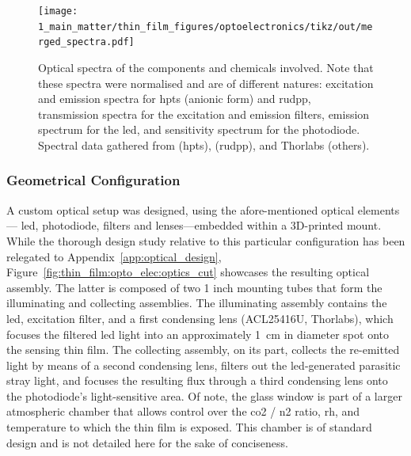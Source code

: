 \begin{figure}
	\texttt{[image: 1\_main\_matter/thin\_film\_figures/optoelectronics/tikz/out/merged\_spectra.pdf]}
	\caption[Optical spectra of the components and chemicals involved.]{Optical spectra of the components and chemicals involved. Note that these spectra were normalised and are of different natures: excitation and emission spectra for \gls{hpts} (anionic form) and \gls{rudpp}, transmission spectra for the excitation and emission filters, emission spectrum for the \gls{led}, and sensitivity spectrum for the photodiode. Spectral data gathered from \cite{wolfbeis1983} (\gls{hpts}), \cite{bultzingslowen2002} (\gls{rudpp}), and Thorlabs (others).}
	\label{fig:thin_film:opto_elec:merged_spectra}
\end{figure}

\subsubsection{Geometrical Configuration}\label{subsect:thin_film:opto_elec:geom_cons}

A custom optical setup was designed, using the afore-mentioned optical elements---\ie{} \gls{led}, photodiode, filters and lenses---embedded within a 3D-printed mount. While the thorough design study relative to this particular configuration has been relegated to Appendix~\ref{app:optical_design}, Figure~\ref{fig:thin_film:opto_elec:optics_cut} showcases the resulting optical assembly. The latter is composed of two 1 inch mounting tubes that form the illuminating and collecting assemblies. The illuminating assembly contains the \gls{led}, excitation filter, and a first condensing lens (ACL25416U, Thorlabs), which focuses the filtered \gls{led} light into an approximately 1~cm in diameter spot onto the sensing thin film. The collecting assembly, on its part, collects the re-emitted light by means of a second condensing lens, filters out the \gls{led}-generated parasitic stray light, and focuses the resulting flux through a third condensing lens onto the photodiode's light-sensitive area. Of note, the glass window is part of a larger atmospheric chamber that allows control over the \gls{co2} / \gls{n2} ratio, \gls{rh}, and temperature to which the thin film is exposed. This chamber is of standard design and is not detailed here for the sake of conciseness.


